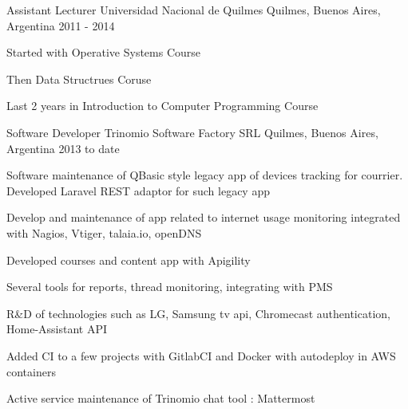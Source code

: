 

\begin{cventries}

  \cventry
    {Assistant Lecturer} %
    {Universidad Nacional de Quilmes} %
    {Quilmes, Buenos Aires, Argentina} %
    {2011 - 2014} %
    {
      \begin{cvitems} %
        \item {Started with Operative Systems Course}
        \item {Then Data Structrues Coruse}
        \item {Last 2 years in Introduction to Computer Programming Course}
      \end{cvitems}
    }

  \cventry
    {Software Developer} %
    {Trinomio Software Factory SRL} %
    {Quilmes, Buenos Aires, Argentina} %
    {2013 to date} %
    {
      \begin{cvitems} %
        \item {Software maintenance of QBasic style legacy app of devices tracking for courrier. Developed Laravel REST adaptor for such legacy app}
        \item {Develop and maintenance of app related to internet usage monitoring integrated with Nagios, Vtiger, talaia.io, openDNS }
        \item {Developed courses and content app with Apigility}
        \item {Several tools for reports, thread monitoring, integrating with PMS }
        \item {R\&D of technologies such as LG, Samsung tv api, Chromecast authentication, Home-Assistant API }
        \item {Added CI to a few projects with GitlabCI and Docker with autodeploy in AWS containers}
        \item {Active service maintenance of Trinomio chat tool : Mattermost }
      \end{cvitems}
    }

\end{cventries}
